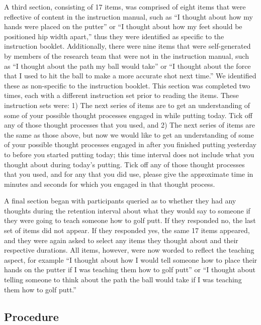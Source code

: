 \documentclass[
  english,
  man,floatsintext]{apa7}
\begin{document}
A third section, consisting of 17 items, was comprised of eight items that were reflective of content in the instruction manual, such as ``I thought about how my hands were placed on the putter'' or ``I thought about how my feet should be positioned hip width apart,'' thus they were identified as specific to the instruction booklet. Additionally, there were nine items that were self-generated by members of the research team that were not in the instruction manual, such as ``I thought about the path my ball would take'' or ``I thought about the force that I used to hit the ball to make a more accurate shot next time.'' We identified these as non-specific to the instruction booklet. This section was completed two times, each with a different instruction set prior to reading the items. These instruction sets were: 1) The next series of items are to get an understanding of some of your possible thought processes engaged in while putting today. Tick off any of those thought processes that you used, and 2) The next series of items are the same as those above, but now we would like to get an understanding of some of your possible thought processes engaged in after you finished putting yesterday to before you started putting today; this time interval does not include what you thought about during today's putting. Tick off any of those thought processes that you used, and for any that you did use, please give the approximate time in minutes and seconds for which you engaged in that thought process.

A final section began with participants queried as to whether they had any thoughts during the retention interval about what they would say to someone if they were going to teach someone how to golf putt. If they responded no, the last set of items did not appear. If they responded yes, the same 17 items appeared, and they were again asked to select any items they thought about and their respective durations. All items, however, were now worded to reflect the teaching aspect, for example ``I thought about how I would tell someone how to place their hands on the putter if I was teaching them how to golf putt'' or ``I thought about telling someone to think about the path the ball would take if I was teaching them how to golf putt.''

\hypertarget{procedure}{%
\subsection{Procedure}\label{procedure}}
\end{document}
